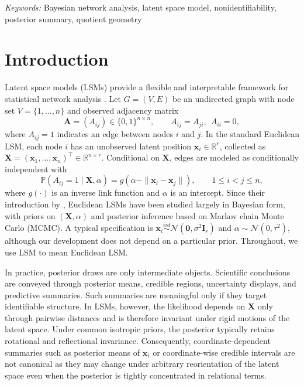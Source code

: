 \documentclass[12pt]{article}
\newcommand{\simiid}{\overset{iid}{\sim}}
\newcommand{\bbP}{\mathbb{P}}
\newcommand{\bbR}{\mathbb{R}}
\newcommand{\bfA}{\boldsymbol{A}}
\newcommand{\bfI}{\boldsymbol{I}}
\newcommand{\bfX}{\boldsymbol{X}}
\newcommand{\bfx}{\boldsymbol{x}}
\newcommand{\bfzero}{\boldsymbol{0}}
\begin{document}
\noindent%
{\it Keywords:} Bayesian network analysis, latent space model, nonidentifiability, posterior summary, quotient geometry

\newpage
{} %

\section{Introduction}\label{sec:intro}

Latent space models (LSMs) provide a flexible and interpretable framework for statistical network
analysis \citep{hoff_2002_LatentSpaceApproaches}. Let $G=(V,E)$ be an undirected graph with node set
$V=\{1,\ldots,n\}$ and observed adjacency matrix
\[
\bfA=(A_{ij})\in\{0,1\}^{n\times n},\qquad A_{ij}=A_{ji},\ \ A_{ii}=0,
\]
where $A_{ij}=1$ indicates an edge between nodes $i$ and $j$. In the standard Euclidean LSM, each
node $i$ has an unobserved latent position $\bfx_i\in\bbR^r$, collected as
$ \bfX=(\bfx_1,\ldots,\bfx_n)^\top\in\bbR^{n\times r}.$
Conditional on $\bfX$, edges are modeled as conditionally independent with
\begin{equation}\label{eq:lsm}
\bbP(A_{ij}=1 \mid \bfX,\alpha)
= g\!\left(\alpha - \|\bfx_i - \bfx_j\|\right),
\qquad 1\le i<j\le n,
\end{equation}
where $g(\cdot)$ is an inverse link function and $\alpha$ is an intercept. Since
their introduction by \citet{hoff_2002_LatentSpaceApproaches}, Euclidean LSMs have been studied
largely in Bayesian form, with priors on $(\bfX,\alpha)$ and posterior inference based on Markov
chain Monte Carlo (MCMC). A typical specification is
$\bfx_i \simiid \mathcal{N}(\bfzero,\sigma^2 \bfI_r)$ and
$\alpha \sim \mathcal{N}(0,\tau^2)$, although our development does not depend on a particular prior.
Throughout, we use LSM to mean Euclidean LSM.

In practice, posterior draws are only intermediate objects. Scientific conclusions are conveyed
through posterior means, credible regions, uncertainty displays, and predictive summaries. Such
summaries are meaningful only if they target identifiable structure. In LSMs, however, the
likelihood depends on $\bfX$ only through pairwise distances and is therefore invariant under rigid
motions of the latent space. Under common isotropic priors, the posterior typically retains
rotational and reflectional invariance. Consequently, coordinate-dependent summaries such as
posterior means of $\bfx_i$ or coordinate-wise credible intervals are not canonical as they may change
under arbitrary reorientation of the latent space even when the posterior is tightly concentrated in
relational terms. 
\end{document}
